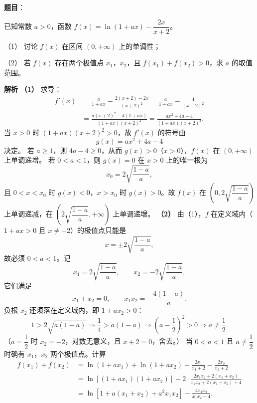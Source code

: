 \begin{answer}

\textbf{题目}：

已知常数 $a>0$，函数 $f(x)=\ln(1+ax)-\dfrac{2x}{x+2}$。

（1） 讨论 $f(x)$ 在区间 $(0,+\infty)$ 上的单调性；

（2） 若 $f(x)$ 存在两个极值点 $x_1$，$x_2$，且 $f(x_1)+f(x_2)>0$，求 $a$ 的取值范围。

\textbf{解析}
\textbf{（1）} 求导：
\nopagebreak[4]
\[\begin{aligned}
f'(x)&=\frac a{1+ax}-\frac{2(x+2)-2x}{(x+2)^2}
=\frac a{1+ax}-\frac4{(x+2)^2}\\
&=\frac{a(x+2)^2-4(1+ax)}{(1+ax)(x+2)^2}
=\frac{ax^2+4a-4}{(1+ax)(x+2)^2} .
\end{aligned}\]
当 $x>0$ 时 $(1+ax)(x+2)^2>0$，故 $f'(x)$ 的符号由
\nopagebreak[4]
\[g(x)=ax^2+4a-4\]
决定。
若 $a\geqslant1$，则 $4a-4\geqslant0$，从而 $g(x)>0$（$x>0$），$f(x)$ 在 $(0,+\infty)$ 上单调递增。
若 $0<a<1$，则 $g(x)=0$ 在 $x>0$ 上的唯一根为
\nopagebreak[4]
\[x_0=2\sqrt{\frac{1-a}a},\]
且 $0<x<x_0$ 时 $g(x)<0$，$x>x_0$ 时 $g(x)>0$。故 $f(x)$ 在 $\left(0,2\sqrt{\dfrac{1-a}a}\right)$ 上单调递减，在 $\left(2\sqrt{\dfrac{1-a}a},+\infty\right)$ 上单调递增。
\textbf{（2）} 由（1），$f$ 在定义域内（$1+ax>0$ 且 $x\neq-2$）的极值点只能是
\nopagebreak[4]
\[x=\pm2\sqrt{\frac{1-a}a},\]
故必须 $0<a<1$。记
\nopagebreak[4]
\[x_1=2\sqrt{\frac{1-a}a},\qquad x_2=-2\sqrt{\frac{1-a}a},\]
它们满足
\nopagebreak[4]
\[x_1+x_2=0,\qquad x_1x_2=-\frac{4(1-a)}a .\]
负根 $x_2$ 还须落在定义域内，即 $1+ax_2>0$：
\nopagebreak[4]
\[1>2\sqrt{a(1-a)}\Longrightarrow\frac14>a(1-a)\Longrightarrow\left(a-\frac12\right)^2>0\Longrightarrow a\neq\frac12 .\]
（$a=\dfrac12$ 时 $x_2=-2$，对数无意义，且 $x+2=0$，舍去。）
当 $0<a<1$ 且 $a\neq\dfrac12$ 时确有 $x_1$，$x_2$ 两个极值点。计算
\nopagebreak[4]
\[\begin{aligned}
f(x_1)+f(x_2)&=\ln\left(1+ax_1\right)+\ln\left(1+ax_2\right)-\frac{2x_1}{x_1+2}-\frac{2x_2}{x_2+2}\\
&=\ln\left[\left(1+ax_1\right)\left(1+ax_2\right)\right]-2\cdot\frac{2x_1x_2+2\left(x_1+x_2\right)}{x_1x_2+2\left(x_1+x_2\right)+4}\\
&=\ln\left[1+a\left(x_1+x_2\right)+a^2x_1x_2\right]-\frac{4x_1x_2}{x_1x_2+4} .

\end{aligned}\]
\end{answer}
